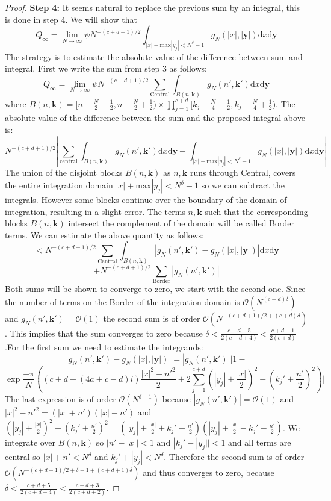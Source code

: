 \documentclass[letterpaper]{article}
\begin{document}
\begin{proof}
\noindent\textbf{Step 4:} It seems natural to replace the previous
sum by an integral, this is done in step 4. We will show that
$$Q_\infty = \lim_{N \to \infty}\psi N^{-(c+d+1)/2}\int_{|x|+
\mathrm{max}|y_j|<N^\delta-1}g_N(|x|,\mathbf{|y|})\mathrm{d}x\mathrm{d}\mathbf{y}$$
The strategy is to estimate the absolute value of the difference
between sum and integral. First we write the sum from step 3 as
follows:
$$Q_\infty=\lim_{N\to\infty}\psi N^{-(c+d+1)/2}\sum_{\mathrm{Central}}\int_{B(n,\mathbf{k})}g_N(n',\mathbf{k'})\mathrm{d}x\mathrm{d}\mathbf{y}$$ where $B(n,\mathbf{k})=[n-\frac{N}{2}-\frac{1}{2},n-\frac{N}{2}+\frac{1}{2})\times\prod_{j = 1}^{c+d}[k_j-\frac{N}{4}-\frac{1}{2},k_j-\frac{N}{4}+\frac{1}{2})$. The absolute value of the difference between the sum and the proposed integral above is: $$N^{-(c+d+1)/2}|\sum_{\mathrm{central}}\int_{B(n,\mathbf{k})}g_N(n',\mathbf{k'})\mathrm{d}x\mathrm{d}\mathbf{y}-\int_{|x|+ \mathrm{max}|y_j|<N^\delta-1}g_N(|x|,\mathbf{|y|})\mathrm{d}x\mathrm{d}\mathbf{y}|$$
The union of the disjoint blocks $B(n,\mathbf{k})$ as
$n,\mathbf{k}$ runs through Central, covers the entire integration
domain $|x|+ \mathrm{max}|y_j|<N^\delta-1$ so we can subtract the
integrals. However some blocks continue over the boundary of the
domain of integration, resulting in a slight error. The terms
$n,\mathbf{k}$ such that the corresponding blocks
$B(n,\mathbf{k})$ intersect the complement of the domain will be
called Border terms. We can estimate the above quantity as
follows: $$<
N^{-(c+d+1)/2}\sum_{\mathrm{Central}}\int_{B(n,\mathbf{k})}|g_N(n',\mathbf{k'})-g_N(|x|,\mathbf{|y|})|\mathrm{d}x\mathrm{d}\mathbf{y}$$
$$+N^{-(c+d+1)/2}\sum_{\mathrm{Border}}|g_N(n',\mathbf{k'})|$$
Both sums will be shown to converge to zero, we start with the
second one. Since the number of terms on the Border of the
integration domain is $\mathcal{O}(N^{(c+d)\delta})$ and
$g_N(n',\mathbf{k'})= \mathcal{O}(1)$ the second sum is of order
$\mathcal{O}(N^{-(c+d+1)/2+(c+d)\delta})$. This implies that the
sum converges to zero because
$\delta<\frac{c+d+5}{2(c+d+4)}<\frac{c+d+1}{2(c+d)}$.\newline For
the first sum we need to estimate the integrands:
$$|g_N(n',\mathbf{k'})-g_N(|x|,\mathbf{|y|})|=|g_N(n',\mathbf{k'})||1-$$ $$\exp\frac{-\pi}{N}\left((c+d -(4a+c-d)i)\frac{|x|^2-n'^2}{2}+2\sum_{j=1}^{c+d}(|y_j|+\frac{|x|}{2})^2-(k_j'+\frac{n'}{2})^2\right)|$$ The last expression is of order $\mathcal{O}(N^{\delta-1})$ because $|g_N(n',\mathbf{k'})|=\mathcal{O}(1)$ and $|x|^2-n'^2 = (|x|+n')(|x|-n')$ and $(|y_j|+\frac{|x|}{2})^2-(k_j'+\frac{n'}{2})^2 = (|y_j|+\frac{|x|}{2}+k_j'+\frac{n'}{2})(|y_j|+\frac{|x|}{2}-k_j'-\frac{n'}{2})$. We integrate over $B(n,\mathbf{k})$ so $|n'-|x||<1$ and $|k_j'-|y_j||<1$ and all terms are central so $|x|+n'<N^\delta$ and $k_j'+|y_j|<N^\delta$. Therefore the second sum is of order $\mathcal{O}(N^{-(c+d+1)/2+\delta-1+(c+d+1)\delta})$ and thus converges to zero, because $\delta<\frac{c+d+5}{2(c+d+4)}<\frac{c+d+3}{2(c+d+2)}$.
\newline


\end{proof}
\end{document}
